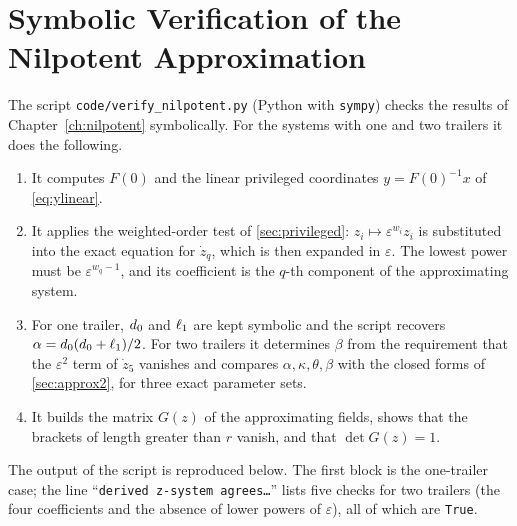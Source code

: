 
\chapter{Symbolic Verification of the Nilpotent Approximation}
\label{app:nilpotent}

The script \texttt{code/verify\_nilpotent.py} (Python with \texttt{sympy})
checks the results of Chapter~\ref{ch:nilpotent} symbolically. For the systems
with one and two trailers it does the following.

\begin{enumerate}
  \item It computes $F(0)$ and the linear privileged coordinates
        $y=F(0)^{-1}x$ of \eqref{eq:ylinear}.
  \item It applies the weighted-order test of \cref{sec:privileged}:
        $z_i\mapsto\varepsilon^{w_i}z_i$ is substituted into the exact equation
        for $\dot z_q$, which is then expanded in $\varepsilon$. The lowest power
        must be $\varepsilon^{w_q-1}$, and its coefficient is the $q$-th
        component of the approximating system.
  \item For one trailer, $d_0$ and $\ell_1$ are kept symbolic and the script
        recovers $\alpha=d_0(d_0+\ell_1)/2$. For two trailers it determines
        $\beta$ from the requirement that the $\varepsilon^2$ term of $\dot z_5$
        vanishes and compares $\alpha,\kappa,\theta,\beta$ with the closed
        forms of \cref{sec:approx2}, for three exact parameter sets.
  \item It builds the matrix $G(z)$ of the approximating fields, shows that the
        brackets of length greater than $r$ vanish, and that $\det G(z)=1$.
\end{enumerate}

The output of the script is reproduced below. The first block is the one-trailer
case; the line ``\texttt{derived z-system agrees\dots}'' lists five checks for
two trailers (the four coefficients and the absence of lower powers of
$\varepsilon$), all of which are \texttt{True}.

